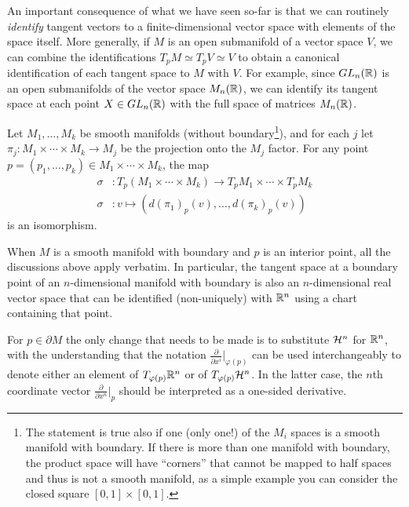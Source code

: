 An important consequence of what we have seen so-far is that we can routinely \emph{identify} tangent vectors to a finite-dimensional vector space with elements of the space itself.
More generally, if $M$ is an open submanifold of a vector space $V$, we can combine the identifications $T_p M \simeq T_p V \simeq V$ to obtain a canonical identification of each tangent space to $M$ with $V$.
For example, since $GL_n(\mathbb{R})$ is an open submanifolds of the vector space $M_n(\mathbb{R})$, we can identify its tangent space at each point $X\in GL_n(\mathbb{R})$ with the full space of matrices $M_n(\mathbb{R})$.

\begin{exercise}
  Let $M_1, \ldots, M_k$ be smooth manifolds (without boundary\footnote{The statement is true also if one (only one!) of the $M_i$ spaces is a smooth manifold with boundary. If there is more than one manifold with boundary, the product space will have ``corners'' that cannot be mapped to half spaces and thus is not a smooth manifold, as a simple example you can consider the closed square $[0,1]\times [0,1]$.}), and for each $j$ let $\pi_j:M_1\times\cdots\times M_k \to M_j$ be the projection onto the $M_j$ factor.
  For any point $p=(p_1,\ldots,p_k)\in M_1\times\cdots\times M_k$, the map
  \begin{align}
    \sigma &: T_p(M_1\times\cdots\times M_k) \to T_p M_1\times\cdots\times T_p M_k\\
    \sigma &: v \mapsto \left(d(\pi_1)_p(v), \ldots, d(\pi_k)_p(v)\right)
  \end{align}
  is an isomorphism.
\end{exercise}

\begin{remark}
  When $M$ is a smooth manifold with boundary and $p$ is an interior point, all the discussions above apply verbatim. In particular, the tangent space at a boundary point of an $n$-dimensional manifold with boundary is also an $n$-dimensional real vector space that can be identified (non-uniquely) with $\mathbb{R}^n$ using a chart containing that point.

  For $p\in\partial M$ the only change that needs to be made is to substitute $\mathcal{H}^n$ for $\mathbb{R}^n$, with the understanding that the notation $\frac{\partial}{\partial x^i}\big|_{\varphi(p)}$ can be used interchangeably to denote either an element of $T_{\varphi(p)}\mathbb{R}^n$ or of $T_{\varphi(p)}\mathcal{H}^n$. In the latter case, the $n$th coordinate vector $\frac{\partial}{\partial x^n}\big|_{p}$ should be interpreted as a one-sided derivative.
\end{remark}

